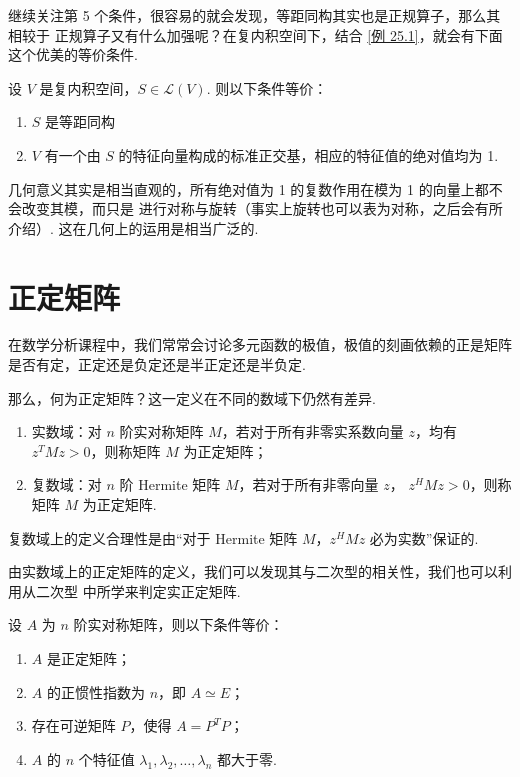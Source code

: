 继续关注第 5 个条件，很容易的就会发现，等距同构其实也是正规算子，那么其相较于
正规算子又有什么加强呢？在复内积空间下，结合 \ref{例 25.1}，就会有下面这个优美的等价条件. 

\begin{theorem}
    设 $ V $ 是复内积空间，$ S \in \mathcal{L}(V) $. 则以下条件等价：
    \begin{enumerate}
        \item $ S $ 是等距同构
        
        \item $ V $ 有一个由 $ S $ 的特征向量构成的标准正交基，相应的特征值的绝对值均为 1. 
    \end{enumerate}
\end{theorem}

几何意义其实是相当直观的，所有绝对值为 1 的复数作用在模为 1 的向量上都不会改变其模，而只是
进行对称与旋转（事实上旋转也可以表为对称，之后会有所介绍）. 这在几何上的运用是相当广泛的.  

\section{正定矩阵}

在数学分析课程中，我们常常会讨论多元函数的极值，极值的刻画依赖的正是矩阵是否有定，正定还是负定还是半正定还是半负定. 

那么，何为正定矩阵？这一定义在不同的数域下仍然有差异. 

\begin{definition} 
    \begin{enumerate}
        \item 实数域：对 $ n $ 阶实对称矩阵 $ M $，若对于所有非零实系数向量 $ z $，均有
        $ z^{T}Mz > 0 $，则称矩阵 $ M $ 为正定矩阵；
        
        \item 复数域：对 $ n $ 阶 Hermite 矩阵 $ M $，若对于所有非零向量 $ z $，
        $ z^{H}Mz > 0 $，则称矩阵 $ M $ 为正定矩阵. 
    \end{enumerate}
\end{definition}

复数域上的定义合理性是由“对于 Hermite 矩阵 $ M $，$ z^{H}Mz $ 必为实数”保证的. 

由实数域上的正定矩阵的定义，我们可以发现其与二次型的相关性，我们也可以利用从二次型
中所学来判定实正定矩阵. 

\begin{theorem}
    设 $ A $ 为 $ n $ 阶实对称矩阵，则以下条件等价：
    \begin{enumerate}
        \item $ A $ 是正定矩阵；
        
        \item $ A $ 的正惯性指数为 $ n $，即 $ A \simeq E $；
        
        \item 存在可逆矩阵 $ P $，使得 $ A = P^{T}P $；
        
        \item $ A $ 的 $ n $ 个特征值 $ \lambda_1, \lambda_2, \ldots, \lambda_n $ 都大于零. 
    \end{enumerate}
\end{theorem}

